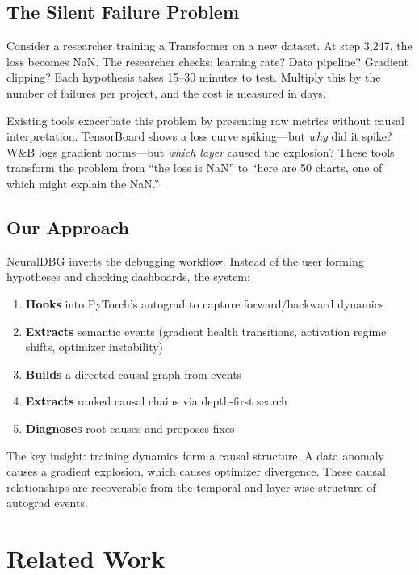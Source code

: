 \documentclass[11pt]{article}
\begin{document}
\subsection{The Silent Failure Problem}

Consider a researcher training a Transformer on a new dataset. At step 3,247, the loss becomes NaN. The researcher checks: learning rate? Data pipeline? Gradient clipping? Each hypothesis takes 15--30 minutes to test. Multiply this by the number of failures per project, and the cost is measured in days.

Existing tools exacerbate this problem by presenting raw metrics without causal interpretation. TensorBoard shows a loss curve spiking---but \emph{why} did it spike? W\&B logs gradient norms---but \emph{which layer} caused the explosion? These tools transform the problem from ``the loss is NaN'' to ``here are 50 charts, one of which might explain the NaN.''

\subsection{Our Approach}

NeuralDBG inverts the debugging workflow. Instead of the user forming hypotheses and checking dashboards, the system:

\begin{enumerate}
    \item \textbf{Hooks} into PyTorch's autograd to capture forward/backward dynamics
    \item \textbf{Extracts} semantic events (gradient health transitions, activation regime shifts, optimizer instability)
    \item \textbf{Builds} a directed causal graph from events
    \item \textbf{Extracts} ranked causal chains via depth-first search
    \item \textbf{Diagnoses} root causes and proposes fixes
\end{enumerate}

The key insight: training dynamics form a causal structure. A data anomaly causes a gradient explosion, which causes optimizer divergence. These causal relationships are recoverable from the temporal and layer-wise structure of autograd events.

\section{Related Work}
\end{document}
